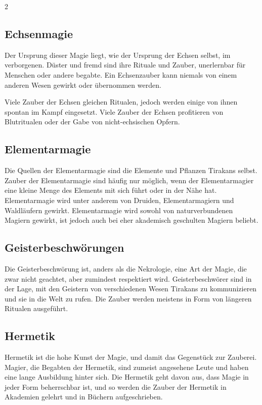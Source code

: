 \begin{multicols}{2}
{\subsection{Echsenmagie}\label{subsec:echsenmagie}

Der Ursprung dieser Magie liegt, wie der Ursprung der Echsen selbst, im verborgenen. Düster und fremd sind ihre Rituale und Zauber, unerlernbar für Menschen oder andere begabte. Ein Echsenzauber kann niemals von einem anderen Wesen gewirkt oder übernommen werden.

Viele Zauber der Echsen gleichen Ritualen, jedoch werden einige von ihnen spontan im Kampf eingesetzt.
Viele Zauber der Echsen profitieren von Blutritualen oder der Gabe von nicht-echsischen Opfern.

\subsection{Elementarmagie}\label{subsec:elementarmagie}

Die Quellen der Elementarmagie sind die Elemente und Pflanzen Tirakans selbst.
Zauber der Elementarmagie sind häufig nur möglich, wenn der Elementarmagier eine kleine Menge des Elements mit sich führt oder in der Nähe hat.
Elementarmagie wird unter anderem von Druiden, Elementarmagiern und Waldläufern gewirkt.
Elementarmagie wird sowohl von naturverbundenen Magiern gewirkt, ist jedoch auch bei eher akademisch geschulten Magiern beliebt.

\subsection{Geisterbeschwörungen}\label{subsec:geisterbeschworungen}

Die Geisterbeschwörung ist, anders als die Nekrologie, eine Art der Magie, die zwar nicht geachtet, aber zumindest respektiert wird.
Geisterbeschwörer sind in der Lage, mit den Geistern von verschiedenen Wesen Tirakans zu kommunizieren und sie in die Welt zu rufen.
Die Zauber werden meistens in Form von längeren Ritualen ausgeführt.

\subsection{Hermetik}\label{subsec:hermetik}

Hermetik ist die hohe Kunst der Magie, und damit das Gegenstück zur Zauberei.
Magier, die Begabten der Hermetik, sind zumeist angesehene Leute und haben eine lange Ausbildung hinter sich.
Die Hermetik geht davon aus, dass Magie in jeder Form beherrschbar ist, und so werden die Zauber der Hermetik in Akademien gelehrt und in Büchern aufgeschrieben.


}
\end{multicols}
